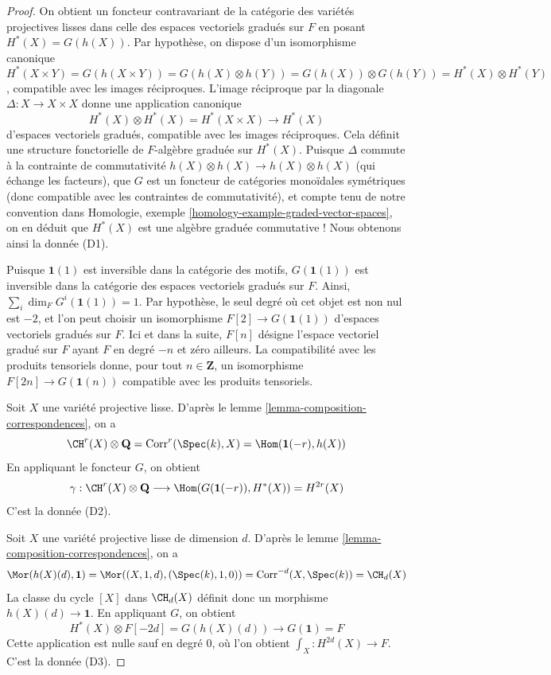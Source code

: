 \begin{proof}
On obtient un foncteur contravariant de la catégorie des variétés
projectives lisses dans celle des espaces vectoriels gradués sur $F$
en posant $H^*(X) = G(h(X))$. Par hypothèse, on dispose d'un isomorphisme
canonique
$$
H^*(X \times Y) = G(h(X \times Y)) = G(h(X) \otimes h(Y)) =
G(h(X)) \otimes G(h(Y)) = H^*(X) \otimes H^*(Y)
$$,
compatible avec les images réciproques. L'image réciproque par la diagonale
$\Delta : X \to X \times X$ donne une application canonique
$$
H^*(X) \otimes H^*(X) = H^*(X \times X) \to H^*(X)
$$
d'espaces vectoriels gradués, compatible avec les images réciproques.
Cela définit une structure fonctorielle de $F$-algèbre graduée sur
$H^*(X)$. Puisque $\Delta$ commute à la contrainte de commutativité
$h(X) \otimes h(X) \to h(X) \otimes h(X)$ (qui échange les facteurs),
que $G$ est un foncteur de catégories monoïdales symétriques (donc compatible avec
les contraintes de commutativité), et compte tenu de notre convention dans
Homologie, exemple \ref{homology-example-graded-vector-spaces},
on en déduit que $H^*(X)$ est une algèbre graduée
commutative ! Nous obtenons ainsi la donnée (D1).

\medskip\noindent
Puisque $\mathbf{1}(1)$ est inversible dans la catégorie des motifs,
$G(\mathbf{1}(1))$ est inversible dans la catégorie des
espaces vectoriels gradués sur $F$. Ainsi, $\sum_i \dim_F G^i(\mathbf{1}(1)) = 1$.
Par hypothèse, le seul degré où cet objet est non nul est $-2$, et l'on peut
choisir un isomorphisme $F[2] \to G(\mathbf{1}(1))$ d'espaces vectoriels gradués sur $F$.
Ici et dans la suite, $F[n]$ désigne l'espace vectoriel gradué sur $F$ ayant
$F$ en degré $-n$ et zéro ailleurs. La compatibilité avec
les produits tensoriels donne, pour tout $n \in \mathbf{Z}$, un isomorphisme
$F[2n] \to G(\mathbf{1}(n))$ compatible avec les produits tensoriels.

\medskip\noindent
Soit $X$ une variété projective lisse. D'après
le lemme \ref{lemma-composition-correspondences}, on a
$$
\CH^r(X) \otimes \mathbf{Q} = \text{Corr}^r(\Spec(k), X) =
\Hom(\mathbf{1}(-r), h(X))
$$
En appliquant le foncteur $G$, on obtient
$$
\gamma :
\CH^r(X) \otimes \mathbf{Q} \longrightarrow
\Hom(G(\mathbf{1}(-r)), H^*(X)) = H^{2r}(X)
$$
C'est la donnée (D2).

\medskip\noindent
Soit $X$ une variété projective lisse de dimension $d$. D'après
le lemme \ref{lemma-composition-correspondences}, on a
$$
\Mor(h(X)(d), \mathbf{1}) = \Mor((X, 1, d), (\Spec(k), 1, 0)) =
\text{Corr}^{-d}(X, \Spec(k)) = \CH_d(X)
$$
La classe du cycle $[X]$ dans $\CH_d(X)$ définit donc un morphisme
$h(X)(d) \to \mathbf{1}$. En appliquant $G$, on obtient
$$
H^*(X) \otimes F[-2d] = G(h(X)(d)) \longrightarrow G(\mathbf{1}) = F
$$
Cette application est nulle sauf en degré $0$, où l'on obtient
$\int_X : H^{2d}(X) \to F$. C'est la donnée (D3).


\end{proof}
